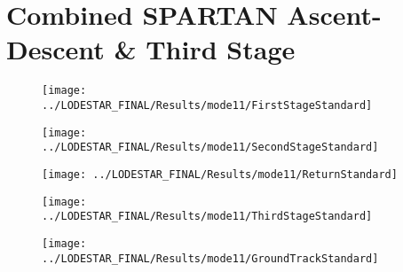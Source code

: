 \section{Combined SPARTAN Ascent-Descent \& Third Stage}



\begin{figure}
\centering
\texttt{[image: ../LODESTAR\_FINAL/Results/mode11/FirstStageStandard]}
\caption{}
\label{fig:FirstStageStandard}
\end{figure}

\begin{figure}
\centering
\texttt{[image: ../LODESTAR\_FINAL/Results/mode11/SecondStageStandard]}
\caption{}
\label{fig:SecondStageStandard}
\end{figure}

\begin{figure}
\centering
\texttt{[image: ../LODESTAR\_FINAL/Results/mode11/ReturnStandard]}
\caption{}
\label{fig:ReturnStandard}
\end{figure}

\begin{figure}
\centering
\texttt{[image: ../LODESTAR\_FINAL/Results/mode11/ThirdStageStandard]}
\caption{}
\label{fig:ThirdStageStandard}
\end{figure}

\begin{figure}
\centering
\texttt{[image: ../LODESTAR\_FINAL/Results/mode11/GroundTrackStandard]}
\caption{}
\label{fig:GroundTrackStandard}
\end{figure}




